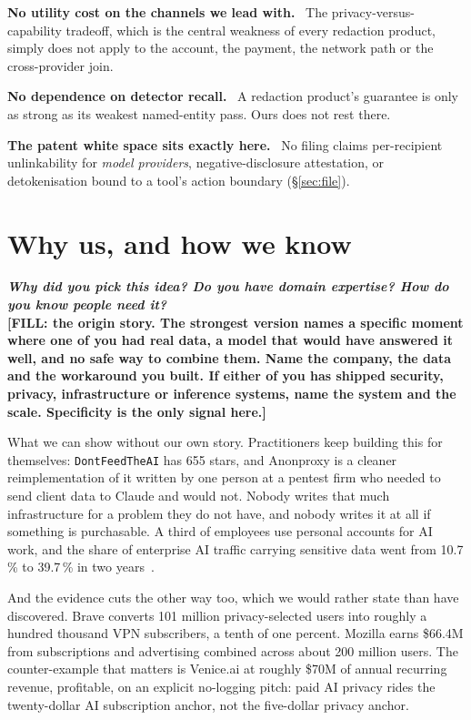 \documentclass[9pt,twocolumn,a4paper]{extarticle}
\newcommand{\para}[1]{\vspace{3pt}\textbf{#1}\ }
\newcommand{\q}[1]{{\fontsize{7}{9}\selectfont\bfseries\itshape\color{indigo!80!black}#1}\\[2pt]}
\begin{document}
\para{No utility cost on the channels we lead with.} The privacy-versus-capability tradeoff, which is the central weakness of every redaction product, simply does not apply to the account, the payment, the network path or the cross-provider join.

\para{No dependence on detector recall.} A redaction product's guarantee is only as strong as its weakest named-entity pass. Ours does not rest there.

\para{The patent white space sits exactly here.} No filing claims per-recipient unlinkability for \emph{model providers}, negative-disclosure attestation, or detokenisation bound to a tool's action boundary (\S\ref{sec:file}).

\section{Why us, and how we know}
\q{Why did you pick this idea? Do you have domain expertise? How do you know people need it?}

\textbf{[FILL: the origin story. The strongest version names a specific moment where one of you had real data, a model that would have answered it well, and no safe way to combine them. Name the company, the data and the workaround you built. If either of you has shipped security, privacy, infrastructure or inference systems, name the system and the scale. Specificity is the only signal here.]}

What we can show without our own story. Practitioners keep building this for themselves: \texttt{DontFeedTheAI} has 655 stars, and Anonproxy is a cleaner reimplementation of it written by one person at a pentest firm who needed to send client data to Claude and would not. Nobody writes that much infrastructure for a problem they do not have, and nobody writes it at all if something is purchasable. A third of employees use personal accounts for AI work, and the share of enterprise AI traffic carrying sensitive data went from 10.7\,\% to 39.7\,\% in two years~\cite{cyberhaven}.

And the evidence cuts the other way too, which we would rather state than have discovered. Brave converts 101 million privacy-selected users into roughly a hundred thousand VPN subscribers, a tenth of one percent. Mozilla earns \$66.4M from subscriptions and advertising combined across about 200 million users. The counter-example that matters is Venice.ai at roughly \$70M of annual recurring revenue, profitable, on an explicit no-logging pitch: paid AI privacy rides the twenty-dollar AI subscription anchor, not the five-dollar privacy anchor.
\end{document}
